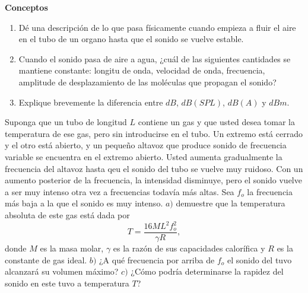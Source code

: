 \begin{mdframed}[style=warning]
	\textbf{Conceptos}
		\begin{enumerate}
			\item Dé una descripción de lo que pasa físicamente cuando empieza a fluir el aire en el tubo de un organo hasta que el sonido se vuelve estable.
			\item Cuando el sonido pasa de aire a agua, ¿cuál de las siguientes cantidades se mantiene constante: longitu de onda, velocidad de onda, frecuencia, amplitude de desplazamiento de las moléculas que propagan el sonido?
			\item Explique brevemente la diferencia entre $dB$, $dB(SPL)$, $dB(A)$ y $dBm$.
		\end{enumerate}
\end{mdframed}



















\begin{mdframed}[style=warning]
	\begin{ejercicio}
		Suponga que un tubo de longitud $L$ contiene un gas y que usted desea tomar la temperatura de ese gas, pero sin introducirse en el tubo. Un extremo está cerrado y el otro está abierto, y un pequeño altavoz que produce sonido de frecuencia variable se encuentra en el extremo abierto. Usted aumenta gradualmente la frecuencia del altavoz hasta qeu el sonido del tubo se vuelve muy ruidoso. Con un aumento posterior de la frecuencia, la intensidad disminuye, pero el sonido vuelve a ser muy intenso otra vez a frecuencias todavía más altas. Sea $f_o$ la frecuencia más baja a la que el sonido es muy intenso. $a)$ demuestre que la temperatura absoluta de este gas está dada por 
			$$ T = \frac{16ML^2 f_o ^2}{\gamma R}, $$
		donde $M$ es la masa molar, $\gamma$ es la razón de sus capacidades calorífica y $R$ es la constante de gas ideal. $b)$ ¿A qué frecuencia por arriba de $f_o$ el sonido del tuvo alcanzará su volumen máximo? $c)$ ¿Cómo podría determinarse la rapidez del sonido en este tuvo a temperatura $T$?
	\end{ejercicio}
\end{mdframed}


























